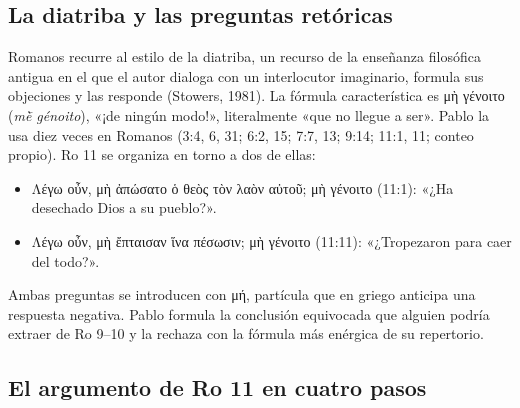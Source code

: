 \documentclass[11pt,letterpaper]{article}
\newcommand{\grc}[1]{\foreignlanguage{ancientgreek}{#1}}
\begin{document}
\subsection{La diatriba y las preguntas retóricas}
Romanos recurre al estilo de la diatriba, un recurso de la enseñanza filosófica antigua en el que el autor dialoga con un interlocutor imaginario, formula sus objeciones y las responde (Stowers, 1981). La fórmula característica es \grc{μὴ γένοιτο} (\emph{mḕ génoito}), «¡de ningún modo!», literalmente «que no llegue a ser». Pablo la usa diez veces en Romanos (3:4, 6, 31; 6:2, 15; 7:7, 13; 9:14; 11:1, 11; conteo propio). Ro 11 se organiza en torno a dos de ellas:
\begin{itemize}
\item \grc{Λέγω οὖν, μὴ ἀπώσατο ὁ θεὸς τὸν λαὸν αὐτοῦ; μὴ γένοιτο} (11:1): «¿Ha desechado Dios a su pueblo?».
\item \grc{Λέγω οὖν, μὴ ἔπταισαν ἵνα πέσωσιν; μὴ γένοιτο} (11:11): «¿Tropezaron para caer del todo?».
\end{itemize}
Ambas preguntas se introducen con \grc{μή}, partícula que en griego anticipa una respuesta negativa. Pablo formula la conclusión equivocada que alguien podría extraer de Ro 9--10 y la rechaza con la fórmula más enérgica de su repertorio.

\subsection{El argumento de Ro 11 en cuatro pasos}
\end{document}
